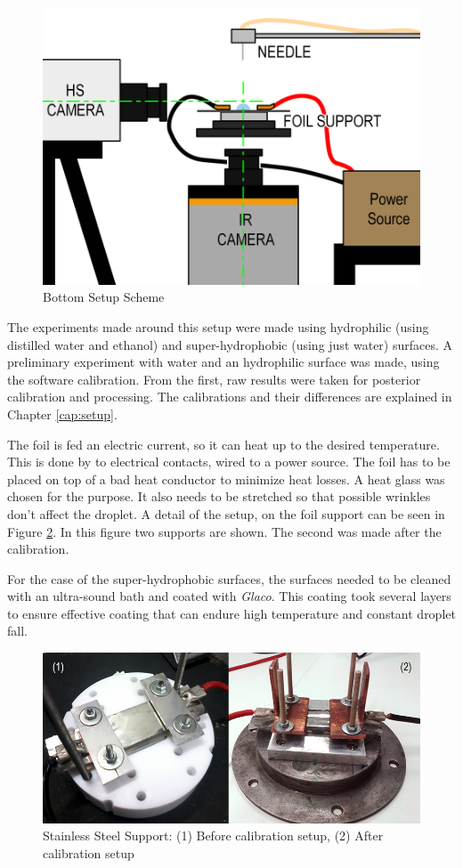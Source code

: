 \begin{figure}[h]
\centering
\includegraphics[width=0.55\linewidth]{Figures/3.Chapter/setup.png}
\caption{Bottom Setup Scheme}
\label{fig:setup}
\end{figure}

\par The experiments made around this setup were made using hydrophilic (using distilled water and ethanol) and super-hydrophobic (using just water) surfaces. A preliminary experiment with water and an hydrophilic surface was made, using the software calibration. From the first, raw results were taken for posterior calibration and processing. The calibrations and their differences are explained in Chapter \ref{cap:setup}.\\

\par The foil is fed an electric current, so it can heat up to the desired temperature. This is done by to electrical contacts, wired to a power source. The foil has to be placed on top of a bad heat conductor to minimize heat losses. A heat glass was chosen for the purpose. It also needs to be stretched so that possible wrinkles don't affect the droplet. A detail of the setup, on the foil support can be seen in Figure \ref{fig:suporte}. In this figure two supports are shown. The second was made after the calibration. \\

\par For the case of the super-hydrophobic surfaces, the surfaces needed to be cleaned with an ultra-sound bath and coated with \textit{Glaco}. This coating took several layers to ensure effective coating that can endure high temperature and constant droplet fall. \\

\begin{figure}[h]
\centering
\includegraphics[width=0.9\linewidth]{Figures/3.Chapter/suporte.png}
\caption{Stainless Steel Support: (1) Before calibration setup, (2) After calibration setup}
\label{fig:suporte}
\end{figure}

